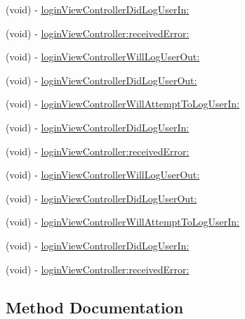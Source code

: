 \begin{DoxyCompactItemize}
\item 
(void) -\/ \hyperlink{protocolFBUserSettingsDelegate_01-p_a66711ccf72e173107d8be71887034d05}{login\+View\+Controller\+Did\+Log\+User\+In\+:}
\item 
(void) -\/ \hyperlink{protocolFBUserSettingsDelegate_01-p_aa7340081c0402e123cdde904f5cf2c91}{login\+View\+Controller\+:received\+Error\+:}
\item 
(void) -\/ \hyperlink{protocolFBUserSettingsDelegate_01-p_a194e956d188265f18ec887255d90b7c8}{login\+View\+Controller\+Will\+Log\+User\+Out\+:}
\item 
(void) -\/ \hyperlink{protocolFBUserSettingsDelegate_01-p_a6e8b97e1802353fbbc0c5058189a3f79}{login\+View\+Controller\+Did\+Log\+User\+Out\+:}
\item 
(void) -\/ \hyperlink{protocolFBUserSettingsDelegate_01-p_a29fe822340933959a1b01785c50b7c4b}{login\+View\+Controller\+Will\+Attempt\+To\+Log\+User\+In\+:}
\item 
(void) -\/ \hyperlink{protocolFBUserSettingsDelegate_01-p_a66711ccf72e173107d8be71887034d05}{login\+View\+Controller\+Did\+Log\+User\+In\+:}
\item 
(void) -\/ \hyperlink{protocolFBUserSettingsDelegate_01-p_aa7340081c0402e123cdde904f5cf2c91}{login\+View\+Controller\+:received\+Error\+:}
\item 
(void) -\/ \hyperlink{protocolFBUserSettingsDelegate_01-p_a194e956d188265f18ec887255d90b7c8}{login\+View\+Controller\+Will\+Log\+User\+Out\+:}
\item 
(void) -\/ \hyperlink{protocolFBUserSettingsDelegate_01-p_a6e8b97e1802353fbbc0c5058189a3f79}{login\+View\+Controller\+Did\+Log\+User\+Out\+:}
\item 
(void) -\/ \hyperlink{protocolFBUserSettingsDelegate_01-p_a29fe822340933959a1b01785c50b7c4b}{login\+View\+Controller\+Will\+Attempt\+To\+Log\+User\+In\+:}
\item 
(void) -\/ \hyperlink{protocolFBUserSettingsDelegate_01-p_a66711ccf72e173107d8be71887034d05}{login\+View\+Controller\+Did\+Log\+User\+In\+:}
\item 
(void) -\/ \hyperlink{protocolFBUserSettingsDelegate_01-p_aa7340081c0402e123cdde904f5cf2c91}{login\+View\+Controller\+:received\+Error\+:}
\end{DoxyCompactItemize}


\subsection{Method Documentation}
\mbox{\label{protocolFBUserSettingsDelegate_01-p_aa7340081c0402e123cdde904f5cf2c91}} 
